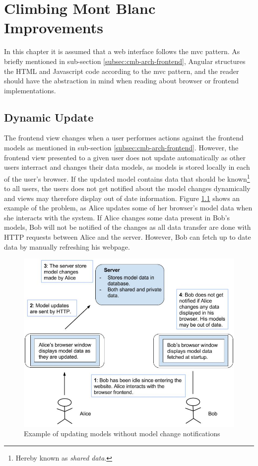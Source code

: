 \chapter{Climbing Mont Blanc Improvements}
\label{ch:improvements}

In this chapter it is assumed that a web interface follows the \gls{mvc} pattern. As briefly mentioned in sub-section \ref{subsec:cmb-arch-frontend}, Angular structures the HTML and Javascript code according to the \gls{mvc} pattern, and the reader should have the abstraction in mind when reading about browser or frontend implementations.

\section{Dynamic Update}
The frontend view changes when a user performes actions against the frontend models as mentioned in sub-section \ref{subsec:cmb-arch-frontend}. However, the frontend view presented to a given user does not update automatically as other users interract and changes their data models, as models is stored locally in each of the user's browser. If the updated model contains data that should be known\footnote{Hereby known as \textit{shared data}.} to all users, the users does not get notified about the model changes dynamically and views may therefore display out of date information. Figure \ref{fig:update-problem} shows an example of the problem, as Alice updates some of her browser's model data when she interacts with the system. If Alice changes some data present in Bob's models, Bob will not be notified of the changes as all data transfer are done with HTTP requests between Alice and the server. However, Bob can fetch up to date data by manually refreshing his webpage.  \\

\begin{figure}
    \centering
    \includegraphics[width=1\textwidth]{figs/update_problem.jpg}
    \caption{Example of updating models without model change notifications}
    \label{fig:update-problem}
\end{figure}


